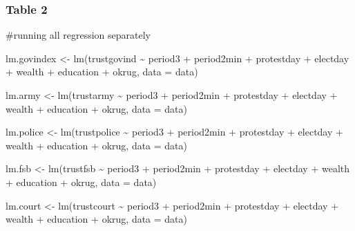 \documentclass[
  letterpaper,
  DIV=11,
  numbers=noendperiod]{scrartcl}
\newenvironment{Shaded}{\begin{snugshade}}{\end{snugshade}}
\newcommand{\AttributeTok}[1]{\textcolor[rgb]{0.40,0.45,0.13}{#1}}
\newcommand{\CommentTok}[1]{\textcolor[rgb]{0.37,0.37,0.37}{#1}}
\newcommand{\FunctionTok}[1]{\textcolor[rgb]{0.28,0.35,0.67}{#1}}
\newcommand{\NormalTok}[1]{\textcolor[rgb]{0.00,0.23,0.31}{#1}}
\newcommand{\OtherTok}[1]{\textcolor[rgb]{0.00,0.23,0.31}{#1}}
\newcommand{\SpecialCharTok}[1]{\textcolor[rgb]{0.37,0.37,0.37}{#1}}
\begin{document}
\subsubsection{Table 2}\label{table-2}

\begin{Shaded}
\begin{Highlighting}[]
\CommentTok{\#running all regression separately}

\NormalTok{lm.govindex }\OtherTok{\textless{}{-}} \FunctionTok{lm}\NormalTok{(trustgovind }\SpecialCharTok{\textasciitilde{}}\NormalTok{ period3 }\SpecialCharTok{+}\NormalTok{ period2min }\SpecialCharTok{+}\NormalTok{ protestday }\SpecialCharTok{+}\NormalTok{ electday }\SpecialCharTok{+}
\NormalTok{                    wealth }\SpecialCharTok{+}\NormalTok{ education }\SpecialCharTok{+}\NormalTok{ okrug, }\AttributeTok{data =}\NormalTok{ data) }

\NormalTok{lm.army }\OtherTok{\textless{}{-}} \FunctionTok{lm}\NormalTok{(trustarmy }\SpecialCharTok{\textasciitilde{}}\NormalTok{ period3 }\SpecialCharTok{+}\NormalTok{ period2min }\SpecialCharTok{+}\NormalTok{ protestday }\SpecialCharTok{+}\NormalTok{ electday }\SpecialCharTok{+}
\NormalTok{                    wealth }\SpecialCharTok{+}\NormalTok{ education }\SpecialCharTok{+}\NormalTok{ okrug, }\AttributeTok{data =}\NormalTok{ data) }

\NormalTok{lm.police }\OtherTok{\textless{}{-}} \FunctionTok{lm}\NormalTok{(trustpolice }\SpecialCharTok{\textasciitilde{}}\NormalTok{ period3 }\SpecialCharTok{+}\NormalTok{ period2min }\SpecialCharTok{+}\NormalTok{ protestday }\SpecialCharTok{+}\NormalTok{ electday }\SpecialCharTok{+}
\NormalTok{                    wealth }\SpecialCharTok{+}\NormalTok{ education }\SpecialCharTok{+}\NormalTok{ okrug, }\AttributeTok{data =}\NormalTok{ data) }

\NormalTok{lm.fsb }\OtherTok{\textless{}{-}} \FunctionTok{lm}\NormalTok{(trustfsb }\SpecialCharTok{\textasciitilde{}}\NormalTok{ period3 }\SpecialCharTok{+}\NormalTok{ period2min }\SpecialCharTok{+}\NormalTok{ protestday }\SpecialCharTok{+}\NormalTok{ electday }\SpecialCharTok{+}
\NormalTok{                    wealth }\SpecialCharTok{+}\NormalTok{ education }\SpecialCharTok{+}\NormalTok{ okrug, }\AttributeTok{data =}\NormalTok{ data) }

\NormalTok{lm.court }\OtherTok{\textless{}{-}} \FunctionTok{lm}\NormalTok{(trustcourt }\SpecialCharTok{\textasciitilde{}}\NormalTok{ period3 }\SpecialCharTok{+}\NormalTok{ period2min }\SpecialCharTok{+}\NormalTok{ protestday }\SpecialCharTok{+}\NormalTok{ electday }\SpecialCharTok{+}
\NormalTok{                    wealth }\SpecialCharTok{+}\NormalTok{ education }\SpecialCharTok{+}\NormalTok{ okrug, }\AttributeTok{data =}\NormalTok{ data) }


\end{Highlighting}
\end{Shaded}
\end{document}
